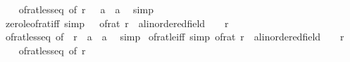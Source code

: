 \begin{isabellebody}
%
\isadelimproof
\ \ %
\endisadelimproof
%
\isatagproof
{}\isamarkupfalse%
\ of{\isacharunderscore}{\kern0pt}rat{\isacharunderscore}{\kern0pt}less{\isacharunderscore}{\kern0pt}eq\ {\isacharbrackleft}{\kern0pt}of\ r\ {}{\isacharcomma}{\kern0pt}\ \ {\isacharprime}{\kern0pt}a\ {\isacharequal}{\kern0pt}\ {\isacharprime}{\kern0pt}a{\isacharbrackright}{\kern0pt}\ \isamarkupfalse%
\ simp%
\endisatagproof
{\isafoldproof}%
%
\isadelimproof
\isanewline
%
\endisadelimproof
\isanewline
{}\isamarkupfalse%
\ zero{\isacharunderscore}{\kern0pt}le{\isacharunderscore}{\kern0pt}of{\isacharunderscore}{\kern0pt}rat{\isacharunderscore}{\kern0pt}iff\ {\isacharbrackleft}{\kern0pt}simp{\isacharbrackright}{\kern0pt}{\isacharcolon}{\kern0pt}\ {\isachardoublequoteopen}{}\ {\isasymle}\ {\isacharparenleft}{\kern0pt}of{\isacharunderscore}{\kern0pt}rat\ r\ {\isacharcolon}{\kern0pt}{\isacharcolon}{\kern0pt}\ {\isacharprime}{\kern0pt}a{\isacharcolon}{\kern0pt}{\isacharcolon}{\kern0pt}linordered{\isacharunderscore}{\kern0pt}field{\isacharparenright}{\kern0pt}\ {\isasymlongleftrightarrow}\ {}\ {\isasymle}\ r{\isachardoublequoteclose}\isanewline
%
\isadelimproof
\ \ %
\endisadelimproof
%
\isatagproof
{}\isamarkupfalse%
\ of{\isacharunderscore}{\kern0pt}rat{\isacharunderscore}{\kern0pt}less{\isacharunderscore}{\kern0pt}eq\ {\isacharbrackleft}{\kern0pt}of\ {}\ r{\isacharcomma}{\kern0pt}\ \ {\isacharprime}{\kern0pt}a\ {\isacharequal}{\kern0pt}\ {\isacharprime}{\kern0pt}a{\isacharbrackright}{\kern0pt}\ \isamarkupfalse%
\ simp%
\endisatagproof
{\isafoldproof}%
%
\isadelimproof
\isanewline
%
\endisadelimproof
\isanewline
{}\isamarkupfalse%
\ of{\isacharunderscore}{\kern0pt}rat{\isacharunderscore}{\kern0pt}le{\isacharunderscore}{\kern0pt}{}{\isacharunderscore}{\kern0pt}iff\ {\isacharbrackleft}{\kern0pt}simp{\isacharbrackright}{\kern0pt}{\isacharcolon}{\kern0pt}\ {\isachardoublequoteopen}{\isacharparenleft}{\kern0pt}of{\isacharunderscore}{\kern0pt}rat\ r\ {\isacharcolon}{\kern0pt}{\isacharcolon}{\kern0pt}\ {\isacharprime}{\kern0pt}a{\isacharcolon}{\kern0pt}{\isacharcolon}{\kern0pt}linordered{\isacharunderscore}{\kern0pt}field{\isacharparenright}{\kern0pt}\ {\isasymle}\ {}\ {\isasymlongleftrightarrow}\ r\ {\isasymle}\ {}{\isachardoublequoteclose}\isanewline
%
\isadelimproof
\ \ %
\endisadelimproof
%
\isatagproof
{}\isamarkupfalse%
\ of{\isacharunderscore}{\kern0pt}rat{\isacharunderscore}{\kern0pt}less{\isacharunderscore}{\kern0pt}eq\ {\isacharbrackleft}{\kern0pt}of\ r\ {}{\isacharbrackright}{\kern0pt}\ \isamarkupfalse%

\end{isabellebody}

